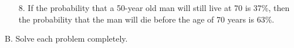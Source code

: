\begin{enumerate}[label = \arabic*. ]
\item[8. ] If the probability that a 50-year old man will still live at 70 is 37\%, then the probability that the man will die before the age of 70 years is 63\%. 
\end{enumerate}  

B. Solve each problem completely.

